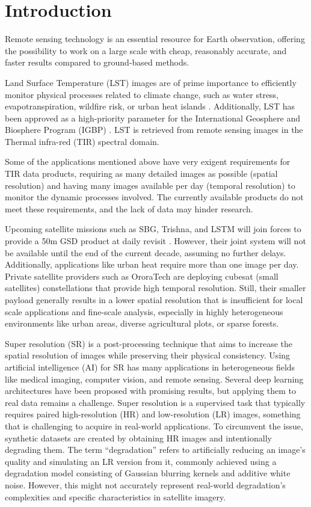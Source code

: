 \section{Introduction} \label{sec:intro}


Remote sensing technology is an essential resource for Earth observation, offering the possibility to work on a large scale with cheap, reasonably accurate, and faster results compared to ground-based methods.

Land Surface Temperature (LST) images are of prime importance to efficiently monitor physical processes related to climate change, such as water stress, evapotranspiration, wildfire risk, or urban heat islands \cite{lst2005}.
Additionally, LST has been approved as a high-priority parameter for the International Geosphere and Biosphere Program (IGBP) \cite{townshend94}. LST is retrieved from remote sensing images in the Thermal infra-red (TIR) spectral domain. 

Some of the applications mentioned above have very exigent requirements for TIR data products, requiring as many detailed images as possible (spatial resolution) and having many images available per day (temporal resolution) to monitor the dynamic processes involved.
The currently available products do not meet these requirements, and the lack of data may hinder research.

Upcoming satellite missions such as SBG, Trishna, and LSTM will join forces to provide a 50m GSD product at daily revisit \cite{author2023thermal}. However, their joint system will not be available until the end of the current decade, assuming no further delays. Additionally, applications like urban heat require more than one image per day.
Private satellite providers such as OroraTech are deploying cubesat (small satellites) constellations that provide high temporal resolution. Still, their smaller payload generally results in a lower spatial resolution that is insufficient for local scale applications and fine-scale analysis, especially in highly heterogeneous environments like urban areas, diverse agricultural plots, or sparse forests.

Super resolution (SR) is a post-processing technique that aims to increase the spatial resolution of images while preserving their physical consistency.
Using artificial intelligence (AI) for SR has many applications in heterogeneous fields like medical imaging, computer vision, and remote sensing. Several deep learning architectures have been proposed with promising results, but applying them to real data remains a challenge. 
Super resolution is a supervised task that typically requires paired high-resolution (HR) and low-resolution (LR) images, something that is challenging to acquire in real-world applications. To circumvent the issue, synthetic datasets are created by obtaining HR images and intentionally degrading them. The term ``degradation'' refers to artificially reducing an image's quality and simulating an LR version from it, commonly achieved using a degradation model consisting of Gaussian blurring kernels and additive white noise. However, this might not accurately represent real-world degradation's complexities and specific characteristics in satellite imagery.

